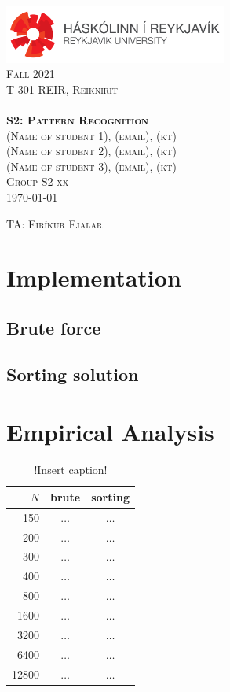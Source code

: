 \documentclass[11pt,a4paper,notitlepage]{article}
\newcommand{\semester}{Fall 2021}
\newcommand{\coursename}{Reiknirit}
\newcommand{\courseid}{T-301-REIR}
\newcommand{\assignment}{S2: Pattern Recognition}
\newcommand{\dateofcompilation}{\today}
\newcommand{\maketitlepage}[1]
{
    \begin{titlepage}

        \begin{center}
            \includegraphics[width=0.55\textwidth]{./rulogo.png}\\[1.5cm]

            \textsc{\huge \semester}\\[0.8cm]

            {\textsc{\Huge \courseid, \coursename}}\\[0.4cm]
            \textsc{\LARGE }\\[2.5cm]

            \textbf{\textsc{\Huge #1}}\\[3cm]


            \textsc{\LARGE (Name of student 1), (email), (kt)}\\  %
            \textsc{\LARGE (Name of student 2), (email), (kt)}\\  %
            \textsc{\LARGE (Name of student 3), (email), (kt)}\\[0.6cm]  %
            \textsc{\LARGE Group S2-xx}\\[1cm]
            \textsc{\Large \dateofcompilation}


        \end{center}

        \vfill

        \begin{flushleft}
            \textsc{\Large TA: Eiríkur Fjalar}   %

        \end{flushleft}

    \end{titlepage}
}
\newcommand{\explanation}[1]{}  %
\begin{document}
    \maketitlepage{\assignment}

\explanation{Directions on performing the assignment are showed here in italics (like this). These should not be included in the report you submit.}

\section{Implementation}

\subsection*{Brute force}

\explanation{Explain \emph{briefly} how you implemented brute force.
            Describe how you implemented compareTo() and the
            slopeTo() methods in the Point data type.}

\subsection*{Sorting solution}
\explanation{Explain \emph{briefly} how you implemented the sorting solution.
           What steps did you do to avoid printing permutations
           and subsegments?}

\section{Empirical Analysis}
\explanation{Fill in the table below with actual running times in
seconds when reasonable (say 180 seconds or less).
You can round to the nearest tenth of a second.}

\begin{table}[htbp]
  \centering
  \caption{!Insert caption!}
        \label{tab:table1}
        \begin{tabular}{|r| c | c |}
        \hline
        $N$ & brute & sorting \\ 
        \hline
        150 & $\ldots$ & $\ldots$ \\
        200 & $\ldots$ & $\ldots$ \\
        300 & $\ldots$ & $\ldots$ \\
        400 & $\ldots$ & $\ldots$ \\
        800 & $\ldots$ & $\ldots$ \\
        1600 & $\ldots$ & $\ldots$ \\
        3200 & $\ldots$ & $\ldots$ \\
        6400 & $\ldots$ & $\ldots$ \\
        12800 & $\ldots$ & $\ldots$ \\
        \hline
        \end{tabular}
\end{table}
\end{document}
